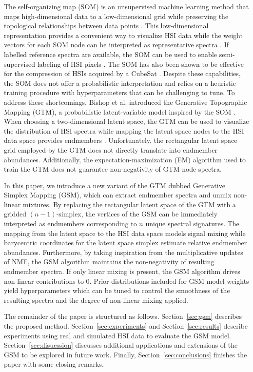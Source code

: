 \documentclass[remotesensing,article,submit,pdftex,moreauthors]{Definitions/mdpi}
\begin{document}
The self-organizing map (SOM) is an unsupervised machine learning method that maps high-dimensional data to a low-dimensional grid while preserving the topological relationships between data points \cite{kohonen-som-1}. This low-dimensional representation provides a convenient way to visualize HSI data while the weight vectors for each SOM node can be interpreted as representative spectra \cite{cantero2004analysis, duran2007time,som-hsi}. If labelled reference spectra are available, the SOM can be used to enable semi-supervised labeling of HSI pixels \cite{riese2019supervised}. The SOM has also been shown to be effective for the compression of HSIs acquired by a CubeSat \cite{som-satellite}. Despite these capabilities, the SOM does not offer a probabilistic interpretation and relies on a heuristic training procedure with hyperparameters that can be challenging to tune. To address these shortcomings, Bishop et al. introduced the Generative Topographic Mapping (GTM), a probabilistic latent-variable model inspired by the SOM \cite{gtm-orig}. When choosing a two-dimensional latent space, the GTM can be used to visualize the distribution of HSI spectra while mapping the latent space nodes to the HSI data space provides endmembers \cite{robot-team-gtm}. Unfortunately, the rectangular latent space grid employed by the GTM does not directly translate into endmember abundances. Additionally, the expectation-maximization (EM) algorithm used to train the GTM does not guarantee non-negativity of GTM node spectra. 

In this paper, we introduce a new variant of the GTM dubbed Generative Simplex Mapping (GSM), which can extract endmember spectra and unmix non-linear mixtures. By replacing the rectangular latent space of the GTM with a gridded $(n-1)$-simplex, the vertices of the GSM can be immediately interpreted as endmembers corresponding to $n$ unique spectral signatures. The mapping from the latent space to the HSI data space models signal mixing while barycentric coordinates for the latent space simplex estimate relative endmember abundances. Furthermore, by taking inspiration from the multiplicative updates of NMF, the GSM algorithm maintains the non-negativity of resulting endmember spectra. If only linear mixing is present, the GSM algorithm drives non-linear contributions to $0$. Prior distributions included for GSM model weights yield hyperparameters which can be tuned to control the smoothness of the resulting spectra and the degree of non-linear mixing applied.

The remainder of the paper is structured as follows. Section~\ref{sec:gsm} describes the proposed method. Section~\ref{sec:experiments} and Section~\ref{sec:results} describe experiments using real and simulated HSI data to evaluate the GSM model. Section~\ref{sec:disucssion} discusses additional applications and extensions of the GSM to be explored in future work. Finally, Section~\ref{sec:conclusions} finishes the paper with some closing remarks.
\end{document}
